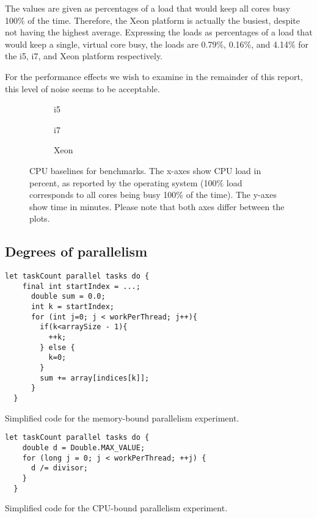 The values are given as percentages of a load that would keep all cores busy
100\% of the time. Therefore, the Xeon platform is actually the busiest,
despite not having the highest average. Expressing the loads as percentages of
a load that would keep a single, virtual core busy, the loads are 0.79\%,
0.16\%, and 4.14\% for the i5, i7, and Xeon platform respectively.

For the performance effects we wish to examine in the remainder of this report,
this level of noise seems to be acceptable.

\begin{figure}[hbpt]
	\graphicspath{{plots/}}
	\begin{subfigure}{1\textwidth}
		
		\caption{i5}
	\end{subfigure}
	\begin{subfigure}{1\textwidth}
		
		\caption{i7}
	\end{subfigure}
	\begin{subfigure}{1\textwidth}
		
		\caption{Xeon}
	\end{subfigure}
	\caption{CPU baselines for benchmarks. The x-axes show CPU load in
	percent, as reported by the operating system (100\% load corresponds to
	all cores being busy 100\% of the time). The y-axes show time in
	minutes. Please note that both axes differ between the plots.}
	\label{fig:cpuload}
\end{figure}

\subsection{Degrees of parallelism}

\begin{code}
\begin{Verbatim}[frame=single]
  let taskCount parallel tasks do {
    final int startIndex = ...;
      double sum = 0.0;
      int k = startIndex;
      for (int j=0; j < workPerThread; j++){
        if(k<arraySize - 1){
          ++k;
        } else {
          k=0;
        }
        sum += array[indices[k]];
      }
  }
\end{Verbatim}
	\caption{Simplified code for the memory-bound parallelism experiment.}
\end{code}

\begin{code}
\begin{Verbatim}[frame=single]
  let taskCount parallel tasks do {
    double d = Double.MAX_VALUE;
    for (long j = 0; j < workPerThread; ++j) {
      d /= divisor;
    }
  }
\end{Verbatim}
	\caption{Simplified code for the CPU-bound parallelism experiment.}
\end{code}

